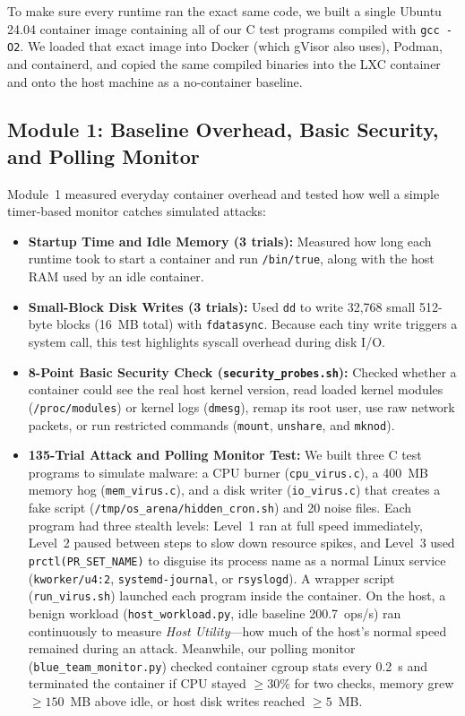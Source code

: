 \documentclass[conference]{IEEEtran}
\begin{document}
To make sure every runtime ran the exact same code, we built a single Ubuntu 24.04 container image containing all of our C test programs compiled with \texttt{gcc -O2}. We loaded that exact image into Docker (which gVisor also uses), Podman, and containerd, and copied the same compiled binaries into the LXC container and onto the host machine as a no-container baseline.

\subsection{Module 1: Baseline Overhead, Basic Security, and Polling Monitor}
Module~1 measured everyday container overhead and tested how well a simple timer-based monitor catches simulated attacks:
\begin{itemize}
    \item \textbf{Startup Time and Idle Memory (3 trials):} Measured how long each runtime took to start a container and run \texttt{/bin/true}, along with the host RAM used by an idle container.
    \item \textbf{Small-Block Disk Writes (3 trials):} Used \texttt{dd} to write 32,768 small 512-byte blocks (16~MB total) with \texttt{fdatasync}. Because each tiny write triggers a system call, this test highlights syscall overhead during disk I/O.
    \item \textbf{8-Point Basic Security Check (\texttt{security\_probes.sh}):} Checked whether a container could see the real host kernel version, read loaded kernel modules (\texttt{/proc/modules}) or kernel logs (\texttt{dmesg}), remap its root user, use raw network packets, or run restricted commands (\texttt{mount}, \texttt{unshare}, and \texttt{mknod}).
    \item \textbf{135-Trial Attack and Polling Monitor Test:} We built three C test programs to simulate malware: a CPU burner (\texttt{cpu\_virus.c}), a 400~MB memory hog (\texttt{mem\_virus.c}), and a disk writer (\texttt{io\_virus.c}) that creates a fake script (\texttt{/tmp/os\_arena/hidden\_cron.sh}) and 20 noise files. Each program had three stealth levels: Level~1 ran at full speed immediately, Level~2 paused between steps to slow down resource spikes, and Level~3 used \texttt{prctl(PR\_SET\_NAME)} to disguise its process name as a normal Linux service (\texttt{kworker/u4:2}, \texttt{systemd-journal}, or \texttt{rsyslogd}). A wrapper script (\texttt{run\_virus.sh}) launched each program inside the container. On the host, a benign workload (\texttt{host\_workload.py}, idle baseline 200.7~ops/s) ran continuously to measure \textit{Host Utility}---how much of the host's normal speed remained during an attack. Meanwhile, our polling monitor (\texttt{blue\_team\_monitor.py}) checked container cgroup stats every 0.2~s and terminated the container if CPU stayed $\ge 30\%$ for two checks, memory grew $\ge 150$~MB above idle, or host disk writes reached $\ge 5$~MB.
\end{itemize}
\end{document}
